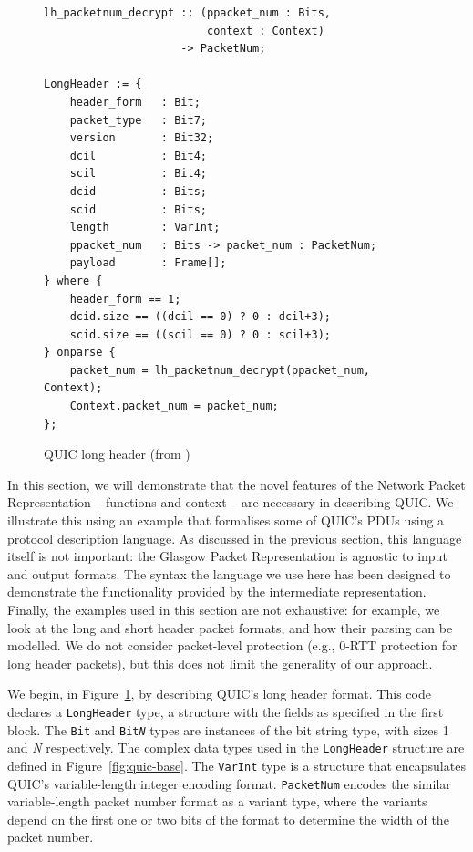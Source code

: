 \documentclass[10pt,sigconf]{acmart}
\begin{document}
\begin{figure}
	\vspace{3mm}
    \begin{BVerbatim}[fontsize=\scriptsize]
lh_packetnum_decrypt :: (ppacket_num : Bits, 
                         context : Context) 
                     -> PacketNum;

LongHeader := {
	header_form   : Bit;
	packet_type   : Bit7;
	version       : Bit32;
	dcil          : Bit4;
	scil          : Bit4;
	dcid          : Bits;
	scid          : Bits;
	length        : VarInt;
	ppacket_num   : Bits -> packet_num : PacketNum;
	payload       : Frame[];
} where {
	header_form == 1;
	dcid.size == ((dcil == 0) ? 0 : dcil+3);
	scid.size == ((scil == 0) ? 0 : scil+3);
} onparse {
	packet_num = lh_packetnum_decrypt(ppacket_num, Context);
	Context.packet_num = packet_num;
};
    \end{BVerbatim}
    \caption{QUIC long header (from \cite{draft-ietf-quic-transport-latest})}
    \label{fig:quic-long-hdr-desc}
\end{figure}

In this section, we will demonstrate that the novel features of the Network Packet Representation
 -- functions and context -- are necessary in describing QUIC. We illustrate
this using an example that formalises some of QUIC's PDUs using a protocol description
language. As discussed in the previous section, this language itself is not important: the
Glasgow Packet Representation is agnostic to input and output formats. The syntax the
language we use here has been designed to demonstrate the functionality provided by the
intermediate representation. Finally, the examples used in this section are not exhaustive:
for example, we look at the long and short header packet formats, and how their parsing
can be modelled. We do not consider packet-level protection (e.g., 0-RTT protection for
long header packets), but this does not limit the generality of our approach.

We begin, in Figure~\ref{fig:quic-long-hdr-desc}, by describing QUIC's long header
format. This code declares a \texttt{LongHeader} type, a structure with the fields as
specified in the first block. The \texttt{Bit} and \texttt{Bit\emph{N}} types are instances
of the bit string type, with sizes 1 and \emph{N} respectively. The complex data types 
used in the \texttt{LongHeader} structure are defined in Figure~\ref{fig:quic-base}. The
\texttt{VarInt} type is a structure that encapsulates QUIC's variable-length integer
encoding format. \texttt{PacketNum} encodes the similar variable-length packet number
format as a variant type, where the variants depend on the first one or two bits of the
format to determine the width of the packet number.
\end{document}
